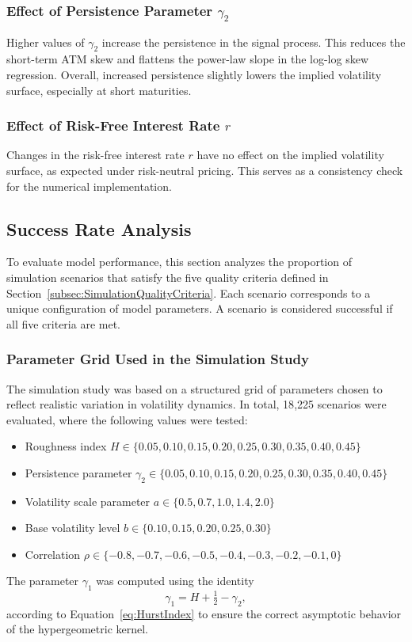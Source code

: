 \subsubsection*{Effect of Persistence Parameter $\gamma_2$}
Higher values of $\gamma_2$ increase the persistence in the signal process. This reduces the short-term ATM skew and flattens the power-law slope in the log-log skew regression. Overall, increased persistence slightly lowers the implied volatility surface, especially at short maturities.

\subsubsection*{Effect of Risk-Free Interest Rate $r$}
Changes in the risk-free interest rate $r$ have no effect on the implied volatility surface, as expected under risk-neutral pricing. This serves as a consistency check for the numerical implementation.


\subsection{Success Rate Analysis} \label{subsec:SuccessRateAnalysis}

To evaluate model performance, this section analyzes the proportion of simulation scenarios that satisfy the five quality criteria defined in Section~\ref{subsec:SimulationQualityCriteria}. Each scenario corresponds to a unique configuration of model parameters. A scenario is considered successful if all five criteria are met.

\subsubsection*{Parameter Grid Used in the Simulation Study}
The simulation study was based on a structured grid of parameters chosen to reflect realistic variation in volatility dynamics. In total, 18{,}225 scenarios were evaluated, where the following values were tested:
\begin{itemize}
    \item Roughness index $H \in \{0.05, 0.10, 0.15, 0.20, 0.25, 0.30, 0.35, 0.40, 0.45\}$
    \item Persistence parameter $\gamma_2 \in \{0.05, 0.10, 0.15, 0.20, 0.25, 0.30, 0.35, 0.40, 0.45\}$
    \item Volatility scale parameter $a \in \{0.5, 0.7, 1.0, 1.4, 2.0\}$
    \item Base volatility level $b \in \{0.10, 0.15, 0.20, 0.25, 0.30\}$
    \item Correlation $\rho \in \{-0.8, -0.7, -0.6, -0.5, -0.4, -0.3, -0.2, -0.1, 0\}$
\end{itemize}
The parameter $\gamma_1$ was computed using the identity
\begin{equation*}
    \gamma_1 = H + \tfrac{1}{2} - \gamma_2,
\end{equation*}
according to Equation~\eqref{eq:HurstIndex} to ensure the correct asymptotic behavior of the hypergeometric kernel.


